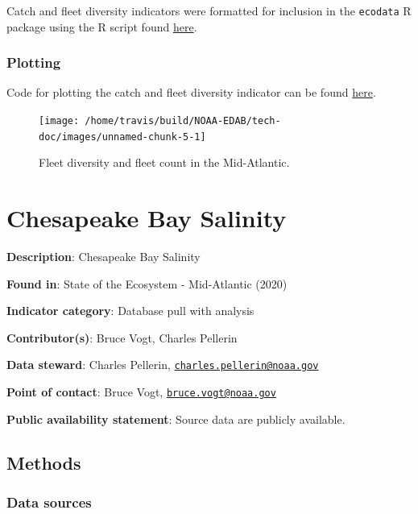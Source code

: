 \documentclass[
]{book}
\begin{document}
Catch and fleet diversity indicators were formatted for inclusion in the \texttt{ecodata} R package using the R script found \href{https://github.com/NOAA-EDAB/ecodata/blob/master/data-raw/get_commercial_div.R}{here}.

\hypertarget{plotting-3}{%
\subsection{Plotting}\label{plotting-3}}

Code for plotting the catch and fleet diversity indicator can be found \href{https://github.com/NOAA-EDAB/ecodata/blob/master/chunk-scripts/human_dimensions.Rmd-comm-div.R}{here}.

\begin{figure}

{\centering \texttt{[image: /home/travis/build/NOAA-EDAB/tech-doc/images/unnamed-chunk-5-1]} 

}

\caption{Fleet diversity and fleet count in the Mid-Atlantic.}\label{fig:unnamed-chunk-5}
\end{figure}

\hypertarget{chesapeake-bay-salinity}{%
\chapter{Chesapeake Bay Salinity}\label{chesapeake-bay-salinity}}

\textbf{Description}: Chesapeake Bay Salinity

\textbf{Found in}: State of the Ecosystem - Mid-Atlantic (2020)

\textbf{Indicator category}: Database pull with analysis

\textbf{Contributor(s)}: Bruce Vogt, Charles Pellerin

\textbf{Data steward}: Charles Pellerin, \href{mailto:charles.pellerin@noaa.gov}{\nolinkurl{charles.pellerin@noaa.gov}}

\textbf{Point of contact}: Bruce Vogt, \href{mailto:bruce.vogt@noaa.gov}{\nolinkurl{bruce.vogt@noaa.gov}}

\textbf{Public availability statement}: Source data are publicly available.

\hypertarget{methods-6}{%
\section{Methods}\label{methods-6}}

\hypertarget{data-sources-6}{%
\subsection{Data sources}\label{data-sources-6}}
\end{document}
